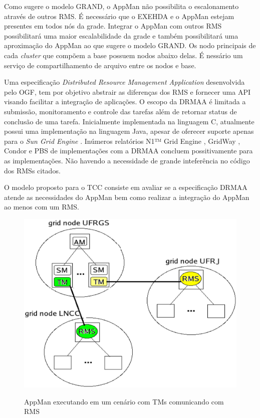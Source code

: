 Como sugere o modelo GRAND, o AppMan não possibilita o escalonamento através de outros RMS. É necessário que o EXEHDA e o AppMan estejam presentes em todos nós da grade. Integrar o AppMan com outros RMS possibilitará uma maior escalabilidade da grade e também possibilitará uma aproximação do AppMan ao que sugere o modelo GRAND. Os nodo principais de cada {\it cluster} que compõem a base possuem nodos abaixo delas. É nessário um serviço de compartilhamento de arquivo entre os nodos e base.

Uma especificação {\it Distributed Resource Management Application} \cite{Rajic2002} desenvolvida pelo OGF, tem por objetivo abstrair as diferenças dos RMS e fornecer uma API visando facilitar a integração de aplicações. O escopo da DRMAA é limitada a submissão, monitoramento e controle das tarefas além de retornar status de conclusão de uma tarefa. Inicialmente implementada na linguagem C, atualmente possui uma implementação na linguagem Java, apesar de oferecer suporte apenas para o {\it Sun Grid Engine} \cite{Templeton}.
Inúmeros relatórios N1™ Grid Engine \cite{Templeton2006}, GridWay \cite{Herrera2007}, Condor \cite{Troeger2007} e PBS \cite{Ciesnik2007} de implementações com a DRMAA concluem possitivamente para as implementações. Não havendo a necessidade de grande inteferência no código dos RMSs citados.

O modelo proposto para o TCC consiste em avaliar se a especificação DRMAA atende as necessidades do AppMan bem como realizar a integração do AppMan ao menos com um RMS.



\begin{figure}[ht]
\center
\includegraphics[scale=.2]{img/AppManRMS.eps}
\label{AppManRMS}
\caption{AppMan executando em um cenário com TMs comunicando com RMS}
\end{figure}
